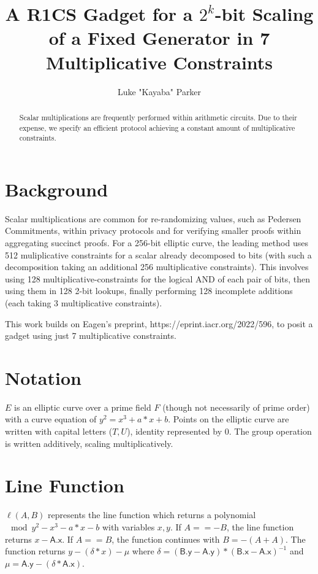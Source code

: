 \documentclass[]{article}
\title{A R1CS Gadget for a $2^k$-bit Scaling of a Fixed Generator in 7 Multiplicative Constraints}
\author{Luke "Kayaba" Parker}
\begin{document}
	
	\maketitle
	
	\begin{abstract}
		
		Scalar multiplications are frequently performed within arithmetic circuits. Due to their expense, we specify an efficient protocol achieving a constant amount of multiplicative constraints.
		
	\end{abstract}
	
	\section{Background}
	
	Scalar multiplications are common for re-randomizing values, such as Pedersen Commitments, within privacy protocols and for verifying smaller proofs within aggregating succinct proofs. For a 256-bit elliptic curve, the leading method uses 512 muliplicative constraints for a scalar already decomposed to bits (with such a decomposition taking an additional 256 multiplicative constraints). This involves using 128 multiplicative-constraints for the logical AND of each pair of bits, then using them in 128 2-bit lookups, finally performing 128 incomplete additions (each taking 3 multiplicative constraints).
	
	This work builds on Eagen's preprint, https://eprint.iacr.org/2022/596, to posit a gadget using just 7 multiplicative constraints.
	
	\section{Notation}
	
    $E$ is an elliptic curve over a prime field $F$ (though not necessarily of prime order) with a curve equation of $y^2 = x^3 + a * x + b$. Points on the elliptic curve are written with capital letters ($T, U$), identity represented by $0$. The group operation is written additively, scaling multiplicatively.

	\section{Line Function}
	
	$\ell(A, B)$ represents the line function which returns a polynomial $\mod y^2 - x^3 - a * x - b$ with variables $x, y$. If $A == -B$, the line function returns $x - \mathsf{A.x}$. If $A == B$, the function continues with $B = -(A + A)$. The function returns $y - (\delta * x) - \mu$ where $\delta = (\mathsf{B.y} - \mathsf{A.y}) * (\mathsf{B.x} - \mathsf{A.x})^{-1}$ and $\mu = \mathsf{A.y} - (\delta * \mathsf{A.x})$.
\end{document}
